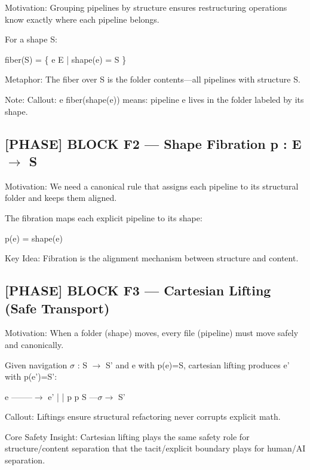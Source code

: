 Motivation: Grouping pipelines by structure ensures restructuring operations know exactly where each pipeline belongs.\par

For a shape S:\par

fiber(S) = \{ e E | shape(e) = S \}\par

 Metaphor: The fiber over S is the folder contents---all pipelines with structure S.\par

Note: Callout: e fiber(shape(e)) means: pipeline e lives in the folder labeled by its shape.\par

\subsection*{[PHASE] BLOCK F2 --- Shape Fibration p : E $\to$ S}

Motivation: We need a canonical rule that assigns each pipeline to its structural folder and keeps them aligned.\par

The fibration maps each explicit pipeline to its shape:\par

p(e) = shape(e)\par

 Key Idea: Fibration is the alignment mechanism between structure and content.\par

\subsection*{[PHASE] BLOCK F3 --- Cartesian Lifting (Safe Transport)}

Motivation: When a folder (shape) moves, every file (pipeline) must move safely and canonically.\par

Given navigation $\sigma$ : S $\to$ S' and e with p(e)=S, cartesian lifting produces e' with p(e')=S':\par

 e --------$\to$ e'
 | |
 p p 
 S ---$\sigma$$\to$ S'\par

 Callout: Liftings ensure structural refactoring never corrupts explicit math.\par

 Core Safety Insight: Cartesian lifting plays the same safety role for structure/content separation that the tacit/explicit boundary plays for human/AI separation.\par

